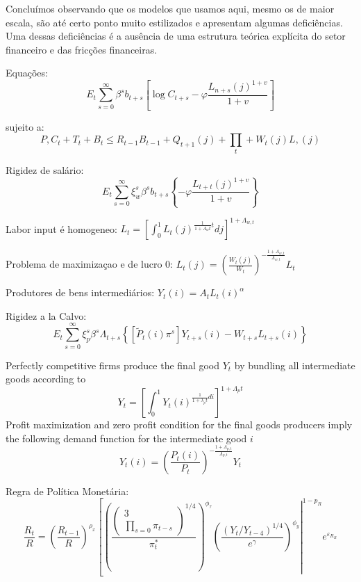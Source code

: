 Concluímos observando que os modelos que usamos aqui, mesmo os de maior escala, são até certo ponto muito estilizados e apresentam algumas deficiências. Uma dessas deficiências é a ausência de uma estrutura teórica explícita do setor financeiro e das fricções financeiras.

Equações:
\begin{equation*} E_{t} \sum_{s=0}^{\infty} \beta^{s} b_{t+s}\left[\log C_{t+s}-\varphi \frac{L_{n+s}(j)^{1+v}}{1+v}\right]\end{equation*}


sujeito a: 
\begin{equation*}P, C_{t}+T_{t}+B_{t} \leq R_{t-1} B_{t-1}+Q_{t+1}(j)+\prod_{t}+W_{t}(j) L,(j)\end{equation*}


Rigidez de salário:
\begin{equation*}E_{t} \sum_{s=0}^{\infty} \xi_{w}^{s} \beta^{s} b_{t+s}\left\{-\varphi \frac{L_{t+t}(j)^{1+v}}{1+v}\right\}\end{equation*}

Labor input é homogeneo:
$L_{t}=\left[\int_{0}^{1} L_{t}(j)^{\frac{1}{1+\Lambda_{w} t} t} d j\right]^{1+\Lambda_{w, t}}$

Problema de maximizaçao e de lucro 0: 
$L_{t}(j)=\left(\frac{W_{t}(j)}{W_{t}}\right)^{-\frac{1+\Lambda_{w, t}}{\Lambda_{w, t}}} L_{t}$

Produtores de bens intermediários:
$Y_t(i) = A_tL_t(i)^{\alpha}$

Rigidez a la Calvo: $$
E_{t} \sum_{s=0}^{\infty} \xi_{p}^{s} \beta^{s} \Lambda_{t+s}\left\{\left[\tilde{P}_{t}(i) \pi^{s}\right] Y_{t+s}(i)-W_{t+s} L_{t+s}(i)\right\}
$$

Perfectly competitive firms produce the final good
$Y_{t}$ by bundling all intermediate goods according to
$$
Y_{t}=\left[\int_{0}^{1} Y_{t}(i)^{\frac{1}{1+\lambda_{p} t} d i}\right]^{1+\Lambda_{p} t}
$$
Profit maximization and zero profit condition for the final goods producers imply the following demand function for the intermediate good $i$
$$
Y_{t}(i)=\left(\frac{P_{t}(i)}{P_{t}}\right)^{-\frac{1+\Lambda_{p, t}}{\Lambda_{p, t}}} Y_{t}
$$

Regra de Política Monetária:
\begin{equation}\frac{R_{t}}{R}=\left(\frac{R_{t-1}}{R}\right)^{\rho_{x}}\left[\left.\left(\frac{\left(\begin{array}{l}
3 \\
\prod_{s=0} \pi_{t-s}
\end{array}\right)^{1 / 4}}{\pi_{t}^{*}}\right)^{\phi_{\tau}}\left(\frac{\left(Y_{t} / Y_{t-4}\right)^{1 / 4}}{e^{\gamma}}\right)^{\phi_{y}}\right|^{1-p_{R}} e^{\varepsilon_{R_{R}}}\right.\end{equation}
%
%
